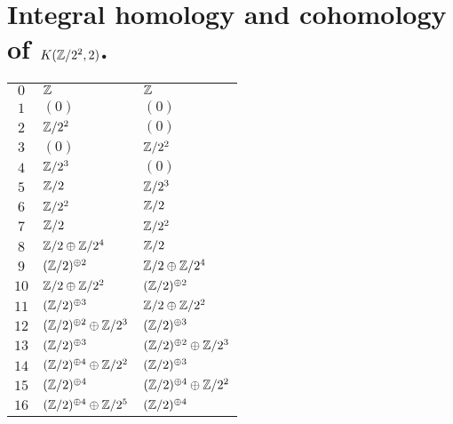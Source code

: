 \section{Integral homology and cohomology of $K(\mathbb{Z}/2^{2},2)$.}
\tablelasttail{\hline}
\begin{supertabular}{|c|p{5.5cm}|p{5.5cm}|}
$0$%
&$\mathbb{Z}$%
&$\mathbb{Z}$\\

$1$%
&$(0)$%
&$(0)$\\

$2$%
&$\mathbb{Z}/2^{2}$%
&$(0)$\\

$3$%
&$(0)$%
&$\mathbb{Z}/2^{2}$\\

$4$%
&$\mathbb{Z}/2^{3}$%
&$(0)$\\

$5$%
&$\mathbb{Z}/2$%
&$\mathbb{Z}/2^{3}$\\

$6$%
&$\mathbb{Z}/2^{2}$%
&$\mathbb{Z}/2$\\

$7$%
&$\mathbb{Z}/2$%
&$\mathbb{Z}/2^{2}$\\

$8$%
&$\mathbb{Z}/2\oplus\mathbb{Z}/2^{4}$%
&$\mathbb{Z}/2$\\

$9$%
&$(\mathbb{Z}/2)^{\oplus2}$%
&$\mathbb{Z}/2\oplus\mathbb{Z}/2^{4}$\\

$10$%
&$\mathbb{Z}/2\oplus\mathbb{Z}/2^{2}$%
&$(\mathbb{Z}/2)^{\oplus2}$\\

$11$%
&$(\mathbb{Z}/2)^{\oplus3}$%
&$\mathbb{Z}/2\oplus\mathbb{Z}/2^{2}$\\

$12$%
&$(\mathbb{Z}/2)^{\oplus2}\oplus\mathbb{Z}/2^{3}$%
&$(\mathbb{Z}/2)^{\oplus3}$\\

$13$%
&$(\mathbb{Z}/2)^{\oplus3}$%
&$(\mathbb{Z}/2)^{\oplus2}\oplus\mathbb{Z}/2^{3}$\\

$14$%
&$(\mathbb{Z}/2)^{\oplus4}\oplus\mathbb{Z}/2^{2}$%
&$(\mathbb{Z}/2)^{\oplus3}$\\

$15$%
&$(\mathbb{Z}/2)^{\oplus4}$%
&$(\mathbb{Z}/2)^{\oplus4}\oplus\mathbb{Z}/2^{2}$\\

$16$%
&$(\mathbb{Z}/2)^{\oplus4}\oplus\mathbb{Z}/2^{5}$%
&$(\mathbb{Z}/2)^{\oplus4}$\\


\end{supertabular}
